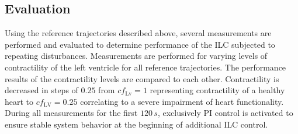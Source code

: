 \subsection{Evaluation}
Using the reference trajectories described above, several measurements are performed and evaluated to determine performance of the ILC subjected to repeating disturbances. Measurements are performed for varying levels of contractility of the left ventricle for all reference trajectories. The performance results of the contractility levels are compared to each other. Contractility is decreased in steps of $0.25$ from $cf_{\mathrm{Lv}}=1$ representing contractility of a healthy heart to $cf_{\mathrm{LV}}=0.25$ correlating to a severe impairment of heart functionality.
\\During all measurements for the first $120\,s$, exclusively PI control is activated to ensure stable system behavior at the beginning of additional ILC control.

